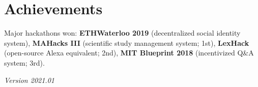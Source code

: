 \documentclass[letterpaper,11pt]{article}
\begin{document}
\section{Achievements}

Major hackathons won: \textbf{ETHWaterloo 2019} (decentralized social identity
system), \textbf{MAHacks III} (scientific study management system; 1st), \textbf{LexHack}
(open-source Alexa equivalent; 2nd), \textbf{MIT Blueprint 2018} (incentivized
Q\&A system; 3rd).

\begin{flushright}
     \textit{Version 2021.01}
\end{flushright}
\end{document}
